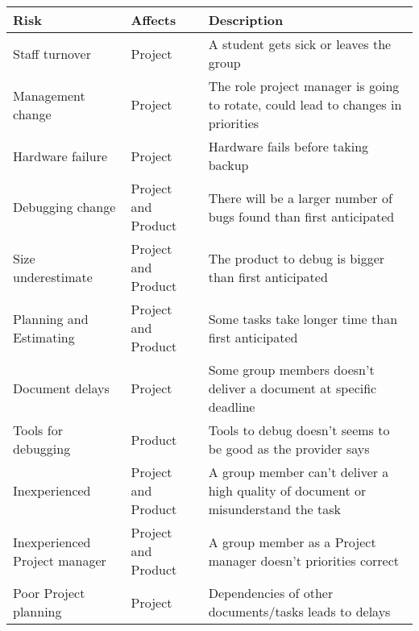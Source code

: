 \begin{center}
	\def\arraystretch{1.5}%
    \begin{tabular}{ | p{3cm} | p{2cm} | p{5cm} |}
    \hline
    \textbf{Risk} & \textbf{Affects} & \textbf{Description} \\ \hline
   	
		Staff turnover & Project & A student gets sick or leaves the group \\ \hline
		
		Management change & Project & The role project manager is going to rotate, could lead to changes in priorities \\ \hline
		
		Hardware failure & Project & Hardware fails before taking backup \\ \hline
		
		Debugging change & Project and Product & There will be a larger number of bugs found than first anticipated \\ \hline
		
		Size underestimate & Project and Product & The product to debug is bigger than first anticipated \\ \hline
		
		Planning and Estimating & Project and Product & Some tasks take longer time than first anticipated \\ \hline
		
		Document delays & Project & Some group members doesn’t deliver a document at specific deadline \\ \hline
		
		Tools for debugging & Product & Tools to debug doesn’t seems to be good as the provider says \\ \hline
		
		Inexperienced & Project and Product & A group member can’t deliver a high quality of document or misunderstand the task \\ \hline
		
		Inexperienced Project manager & Project and Product & A group member as a Project manager doesn’t priorities correct \\ \hline
		
		Poor Project planning & Project & Dependencies of other documents/tasks leads to delays \\
		
    \hline
    \end{tabular}
\end{center}








